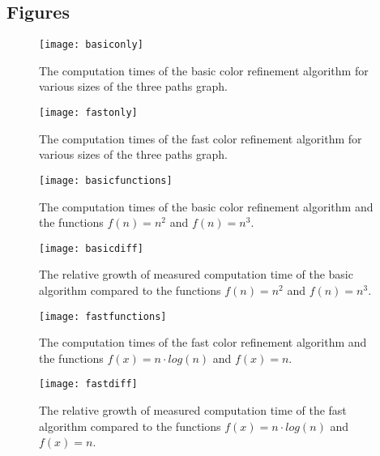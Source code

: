 \documentclass[twoside]{article}
\begin{document}
\begin{appendices}
\newpage
\section{Figures}
\label{app:figs}
\begin{multicols}{2}
\begin{figure}[H]
	\texttt{[image: basiconly]}
	\caption{The computation times of the basic color refinement algorithm for various sizes of the three paths graph.}
	\label{fig:basiconly}
\end{figure}

\begin{figure}[H]
	\texttt{[image: fastonly]}
	\caption{The computation times of the fast color refinement algorithm for various sizes of the three paths graph.}
	\label{fig:fastonly}
\end{figure}

\begin{figure}[H]
	\texttt{[image: basicfunctions]}
	\caption{The computation times of the basic color refinement algorithm and the functions $f(n)=n^2$ and $f(n)=n^3$.}
	\label{fig:basicfunctions}
\end{figure}

\begin{figure}[H]
	\texttt{[image: basicdiff]}
	\caption{The relative growth of measured computation time of the basic algorithm compared to the functions $f(n)=n^2$ and $f(n)=n^3$.}
	\label{fig:basicgrowth}
\end{figure}

\begin{figure}[H]
	\texttt{[image: fastfunctions]}
	\caption{The computation times of the fast color refinement algorithm and the functions $f(x)=n\cdot log(n)$ and $f(x)=n$.}
	\label{fig:fastfunctions}
\end{figure}

\begin{figure}[H]
	\texttt{[image: fastdiff]}
	\caption{The relative growth of measured computation time of the fast algorithm compared to the functions $f(x)=n\cdot log(n)$ and $f(x)=n$.}
	\label{fig:fastgrowth}
\end{figure}
\end{multicols}

\newpage

\end{appendices}
\end{document}
